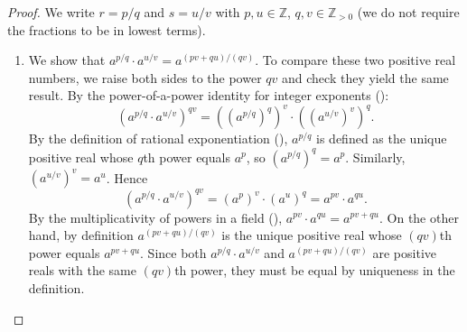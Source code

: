 \begin{proof}
We write $r = p/q$ and $s = u/v$ with $p,u \in \mathbb{Z}$, $q,v \in \mathbb{Z}_{>0}$ (we do not require the fractions to be in lowest terms).

\begin{enumerate}
    \item We show that $a^{p/q} \cdot a^{u/v} = a^{(pv+qu)/(qv)}$. To compare these two positive real numbers, we raise both sides to the power $qv$ and check they yield the same result. By the power-of-a-power identity for integer exponents ():
    $$\left(a^{p/q} \cdot a^{u/v}\right)^{qv} = \left(\left(a^{p/q}\right)^q\right)^v \cdot \left(\left(a^{u/v}\right)^v\right)^q.$$
    By the definition of rational exponentiation (), $a^{p/q}$ is defined as the unique positive real whose $q$th power equals $a^p$, so $\left(a^{p/q}\right)^q = a^p$. Similarly, $\left(a^{u/v}\right)^v = a^u$. Hence
    $$\left(a^{p/q} \cdot a^{u/v}\right)^{qv} = (a^p)^v \cdot (a^u)^q = a^{pv} \cdot a^{qu}.$$
    By the multiplicativity of powers in a field (), $a^{pv} \cdot a^{qu} = a^{pv+qu}$. On the other hand, by definition $a^{(pv+qu)/(qv)}$ is the unique positive real whose $(qv)$th power equals $a^{pv+qu}$. Since both $a^{p/q} \cdot a^{u/v}$ and $a^{(pv+qu)/(qv)}$ are positive reals with the same $(qv)$th power, they must be equal by uniqueness in the definition.


\end{enumerate}
\end{proof}
